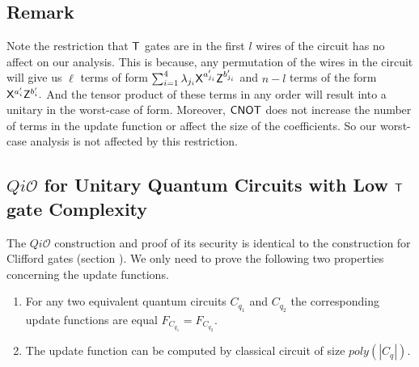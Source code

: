 \subsection{Remark}
\label{remark:nqubit-correction1}
Note the restriction that ${\sf T}$ gates are in the first $l$ wires of the circuit has no affect on our analysis. This is because, any permutation of the wires in the circuit will give us $\ell$ terms of form $\sum_{i=1}^4 \lambda_{j_i} {\sf X}^{a_{j_i}^\prime} {\sf Z}^{b_{j_i}^\prime}$ and $n-l$ terms of the form ${\sf X}^{a_{i}^\prime} {\sf Z}^{b_{i}^\prime}.$  And the tensor product of these terms in any order will result into a unitary in the worst-case of form. Moreover, ${\sf CNOT}$ does not increase the number of terms in the update function or affect the size of the coefficients. So our worst-case analysis is not affected by this restriction.


\subsection{$Qi\mathcal{O}$ for Unitary Quantum Circuits with Low ${\sf T}$ gate Complexity}
The $Qi\mathcal{O}$ construction and proof of its security is identical to the  construction for Clifford gates (section ). We only need to prove the following two properties concerning the update functions.
\begin{enumerate}
\item For any two equivalent quantum circuits $C_{q_1}$ and $C_{q_2}$ the corresponding update functions are equal $F_{C_{q_1}}=F_{C_{q_2}}.$
\item The update function can be computed by classical circuit of size $poly(|C_q|).$
\end{enumerate}

%



